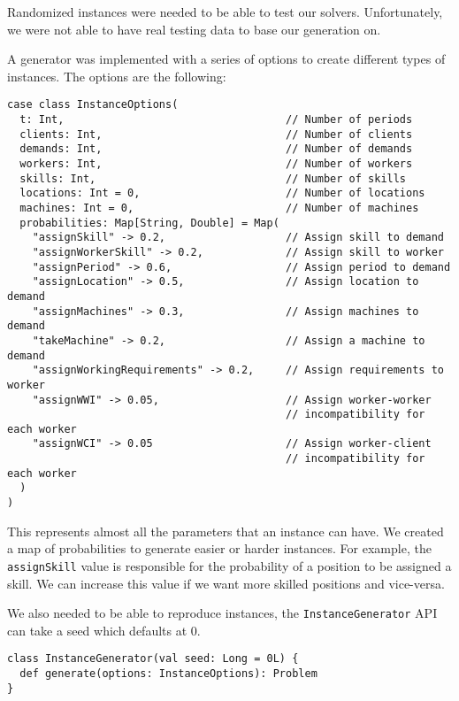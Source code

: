 \documentclass[../thesis.tex]{subfiles}
\begin{document}
Randomized instances were needed to be able to test our solvers. Unfortunately, we were not 
able to have real testing data to base our generation on. 

A generator was implemented with a series of options to create different types of instances. The options are the following:


\begin{lstlisting}[style=scalaStyle,label={instance:options},caption={Instance options},captionpos=b]
case class InstanceOptions(
  t: Int,                                   // Number of periods 
  clients: Int,                             // Number of clients 
  demands: Int,                             // Number of demands 
  workers: Int,                             // Number of workers 
  skills: Int,                              // Number of skills 
  locations: Int = 0,                       // Number of locations 
  machines: Int = 0,                        // Number of machines
  probabilities: Map[String, Double] = Map(
    "assignSkill" -> 0.2,                   // Assign skill to demand
    "assignWorkerSkill" -> 0.2,             // Assign skill to worker
    "assignPeriod" -> 0.6,                  // Assign period to demand
    "assignLocation" -> 0.5,                // Assign location to demand
    "assignMachines" -> 0.3,                // Assign machines to demand
    "takeMachine" -> 0.2,                   // Assign a machine to demand
    "assignWorkingRequirements" -> 0.2,     // Assign requirements to worker
    "assignWWI" -> 0.05,                    // Assign worker-worker 
                                            // incompatibility for each worker 
    "assignWCI" -> 0.05                     // Assign worker-client
                                            // incompatibility for each worker
  )
)
\end{lstlisting}

This represents almost all the parameters that an instance can have. We created a
map of probabilities to generate easier or harder instances. For example,
the \texttt{assignSkill} value is responsible for the probability of a position to be assigned a skill. 
We can increase this value if we want more skilled positions and vice-versa.

We also needed to be able to reproduce instances, the \texttt{InstanceGenerator} API can 
take a seed which defaults at $0$.

  
\begin{lstlisting}[style=scalaStyle,caption={Instance generator API},captionpos=b]
class InstanceGenerator(val seed: Long = 0L) {
  def generate(options: InstanceOptions): Problem
}
\end{lstlisting}
\end{document}
